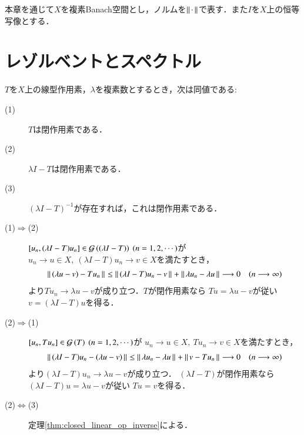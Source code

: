 本章を通じて$X$を複素Banach空間とし，ノルムを$\left\|\, \cdot\, \right\|_{}$で表す．また$I$を$X$上の恒等写像とする．

\section{レゾルベントとスペクトル}
	\begin{screen}
		\begin{lem}[レゾルベントは閉作用素]
			$T$を$X$上の線型作用素，$\lambda$を複素数とするとき，次は同値である:
			\begin{description}
				\item[(1)] $T$は閉作用素である．
				\item[(2)] $\lambda I - T$は閉作用素である．
				\item[(3)] $(\lambda I - T)^{-1}$が存在すれば，これは閉作用素である．
			\end{description}
			\label{lem:resolvent_is_closed}
		\end{lem}
	\end{screen}
	
	\begin{prf}\mbox{}
		\begin{description}
			\item[(1)$\Rightarrow$(2)]
				$[u_n,(\lambda I - T) u_n] \in \Graph{(\lambda I - T)} \ (n=1,2,\cdots)$が
				$u_n \longrightarrow u \in X,\ (\lambda I - T) u_n \longrightarrow v \in X$を満たすとき，
				\begin{align}
					\left\|\, (\lambda u - v) - T u_n\, \right\|_{}
					\leq \left\|\, (\lambda I - T) u_n - v\, \right\|_{} + \left\|\, \lambda u_n - \lambda u\, \right\|_{}
					\longrightarrow 0 \quad (n \longrightarrow \infty)
				\end{align}
				より$T u_n \longrightarrow \lambda u - v$が成り立つ．$T$が閉作用素なら
				$T u = \lambda u - v$が従い$v = (\lambda I - T) u$を得る．
				
			\item[(2)$\Rightarrow$(1)]
				$[u_n,T u_n] \in \Graph{T} \ (n=1,2,\cdots)$が
				$u_n \longrightarrow u \in X,\ T u_n \longrightarrow v \in X$を満たすとき，
				\begin{align}
					\left\|\, (\lambda I - T)u_n - (\lambda u - v)\, \right\|_{}
					\leq \left\|\, \lambda u_n - \lambda u\, \right\|_{} + \left\|\, v - T u_n\, \right\|_{}
					\longrightarrow 0 \quad (n \longrightarrow \infty)
				\end{align}
				より$(\lambda I - T)u_n \longrightarrow \lambda u - v$が成り立つ．
				$(\lambda I - T)$が閉作用素なら$(\lambda I - T)u = \lambda u - v$が従い
				$T u = v$を得る．
				
			\item[(2)$\Leftrightarrow$(3)]
				定理\ref{thm:closed_linear_op_inverse}による．
				\QED
		\end{description}
	\end{prf}
	
